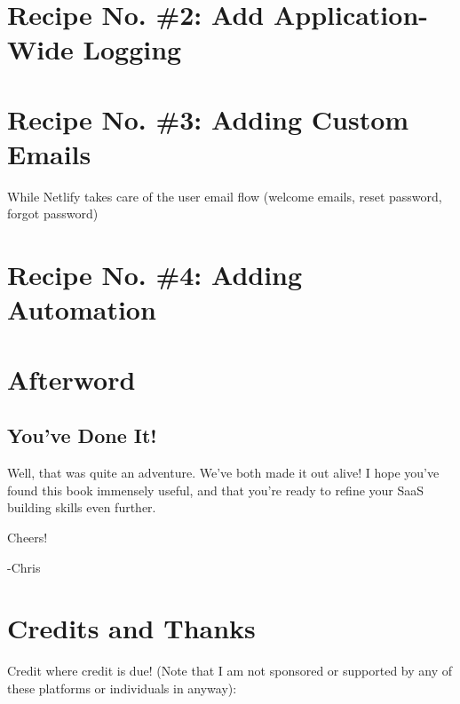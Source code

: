\documentclass[a4paper,
                             oneside,
                             BCOR1.0cm,
                             DIV11,
                             parskip=full,
                             11pt]{scrbook}
\begin{document}
\chapter{Recipe No. \#2: Add Application-Wide Logging}\label{cap:primer}


\chapter{Recipe No. \#3: Adding Custom Emails}\label{cap:primer}

While Netlify takes care of the user email flow (welcome emails, reset password, forgot password)

\chapter{Recipe No. \#4: Adding Automation}\label{cap:primer}

\chapter*{Afterword}\label{cap:primer}

\section*{You've Done It!}\label{sec:titles}

Well, that was quite an adventure. We've both made it out alive! I hope you've found this book immensely useful, and that you're ready to refine your SaaS building skills even further.

Cheers! \beers

-Chris

\chapter*{Credits and Thanks}\label{cap:primer}

Credit where credit is due! (Note that I am not sponsored or supported by any of these platforms or individuals in anyway):
\end{document}
